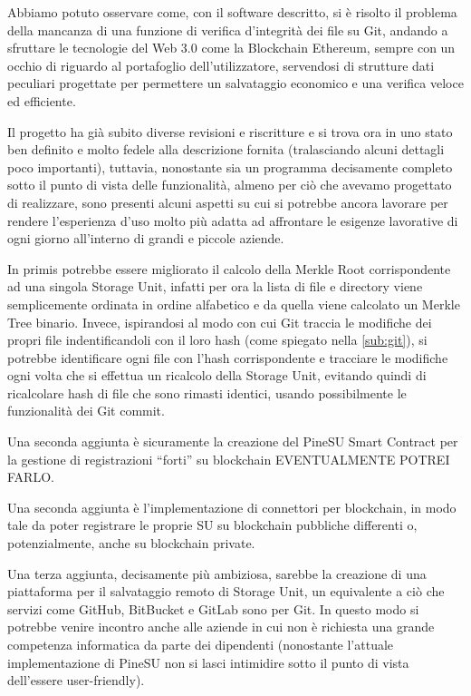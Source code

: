\label{cap:sf}
Abbiamo potuto osservare come, con il software descritto, si è risolto il problema
della mancanza di una funzione di verifica d’integrità dei file su Git,
andando a sfruttare le tecnologie del Web 3.0 come la Blockchain Ethereum,
sempre con un occhio di riguardo al portafoglio dell’utilizzatore,
servendosi di strutture dati peculiari progettate per permettere un salvataggio economico
e una verifica veloce ed efficiente.

Il progetto ha già subito diverse revisioni e riscritture e si trova ora in uno
stato ben definito e molto fedele alla descrizione fornita
(tralasciando alcuni dettagli poco importanti), tuttavia, nonostante sia un programma
decisamente completo sotto il punto di vista delle funzionalità,
almeno per ciò che avevamo progettato di realizzare, sono presenti alcuni aspetti
su cui si potrebbe ancora lavorare per rendere l’esperienza d’uso molto più adatta
ad affrontare le esigenze lavorative di ogni giorno all’interno di grandi e piccole aziende.

In primis potrebbe essere migliorato il calcolo della Merkle Root corrispondente ad
una singola Storage Unit, infatti per ora la lista di file e directory viene semplicemente
ordinata in ordine alfabetico e da quella viene calcolato un Merkle Tree binario.
Invece, ispirandosi al modo con cui Git traccia le modifiche dei propri file
indentificandoli con il loro hash (come spiegato nella \autoref{sub:git}),
si potrebbe identificare ogni file con l’hash corrispondente e tracciare le modifiche
ogni volta che si effettua un ricalcolo della Storage Unit, evitando quindi di ricalcolare
hash di file che sono rimasti identici, usando possibilmente le funzionalità dei Git commit.

Una seconda aggiunta è sicuramente la creazione del PineSU Smart Contract per la gestione
di registrazioni “forti” su blockchain EVENTUALMENTE POTREI FARLO.

Una seconda aggiunta è l’implementazione di connettori per blockchain, in modo tale
da poter registrare le proprie SU su blockchain pubbliche differenti o, potenzialmente,
anche su blockchain private.

Una terza aggiunta, decisamente più ambiziosa, sarebbe la creazione di una piattaforma
per il salvataggio remoto di Storage Unit, un equivalente a ciò che servizi come GitHub,
BitBucket e GitLab sono per Git.
In questo modo si potrebbe venire incontro anche alle aziende in cui non è
richiesta una grande competenza informatica da parte dei dipendenti
(nonostante l’attuale implementazione di PineSU non si lasci intimidire sotto
il punto di vista dell’essere user-friendly).